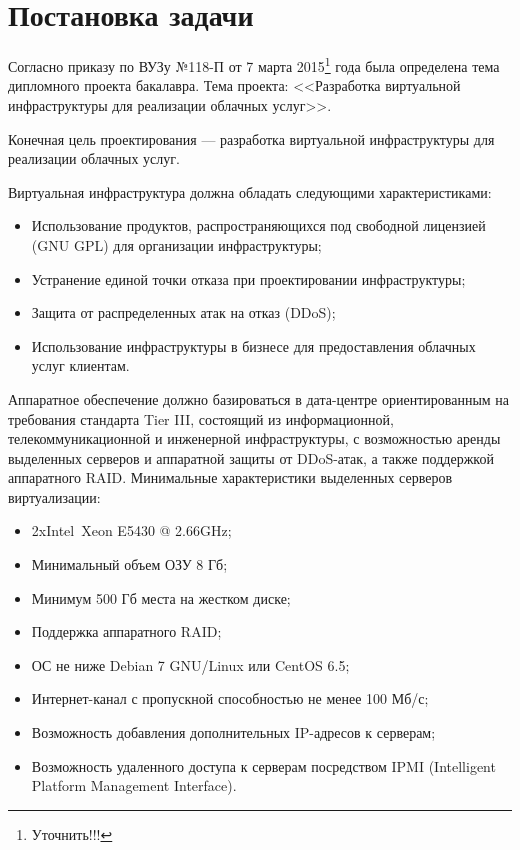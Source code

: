 \section{Постановка задачи}
Согласно приказу по ВУЗу №118-П от 7 марта 2015\footnote{Уточнить!!!} года была определена тема дипломного проекта бакалавра.
Тема проекта: <<Разработка виртуальной инфраструктуры для реализации облачных услуг>>.

Конечная цель проектирования --- разработка виртуальной инфраструктуры для реализации облачных услуг.

Виртуальная инфраструктура должна обладать следующими характеристиками:
\begin{itemize}
    \item Использование продуктов, распространяющихся под свободной лицензией (GNU GPL) для организации инфраструктуры;
    \item Устранение единой точки отказа при проектировании инфраструктуры;
    \item Защита от распределенных атак на отказ (DDoS);
    \item Использование инфраструктуры в бизнесе для предоставления облачных услуг клиентам.
\end{itemize}

Аппаратное обеспечение должно базироваться в дата-центре ориентированным на требования стандарта Tier III, состоящий из информационной, телекоммуникационной и инженерной инфраструктуры, с возможностью аренды выделенных серверов и аппаратной защиты от DDoS-атак, а также поддержкой аппаратного RAID.
Минимальные характеристики выделенных серверов виртуализации:
\begin{itemize}
    \item 2xIntel\textregistered~Xeon E5430 @ 2.66GHz;
    \item Минимальный объем ОЗУ 8 Гб;
    \item Минимум 500 Гб места на жестком диске;
    \item Поддержка аппаратного RAID;
    \item ОС не ниже Debian 7 GNU/Linux или CentOS 6.5;
    \item Интернет-канал с пропускной способностью не менее 100 Мб/с;
    \item Возможность добавления дополнительных IP-адресов к серверам;
    \item Возможность удаленного доступа к серверам посредством IPMI (Intelligent Platform Management Interface).
\end{itemize}

